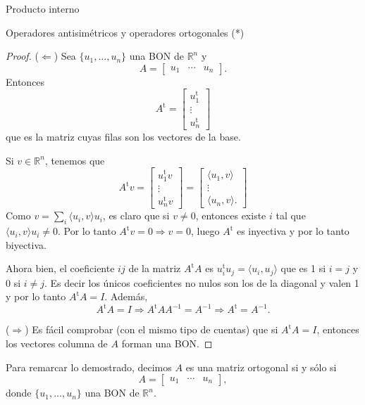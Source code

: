 \documentclass[a4paper,12pt,twoside,spanish,reqno]{amsbook}
\numberwithin{equation}{section}
\theoremstyle{definition}
\theoremstyle{remark}
\newcommand{\la}{\langle}
\newcommand{\ra}{\rangle}
\renewcommand{\t}{{\operatorname{t}}}
\newcommand{\R}{\mathbb R}
\begin{document}
\begin{chapter}{Producto interno}
\begin{section}{Operadores antisimétricos y operadores ortogonales (*)}
\begin{proof}
            ($\Leftarrow$)
            Sea $\{u_1,\ldots,u_n\}$ una BON de $\R^n$ y
            $$ A = \begin{bmatrix}
            u_1 & \cdots & u_n
            \end{bmatrix}. 
            $$
            Entonces
            $$
            A^{\t} = \begin{bmatrix}
            u_1^{\t} \\ \vdots \\ u_n^{\t}
            \end{bmatrix}
            $$
            que es la matriz cuyas filas son los vectores de la base.
            
            
            Si $v \in \R^n$, tenemos que 
            $$
            A^{\t}v = \begin{bmatrix}
            u_1^{\t}v \\ \vdots \\ u_n^{\t}v 
            \end{bmatrix} = 
            \begin{bmatrix}
            \la u_1, v \ra \\ \vdots \\ \la u_n, v \ra.
            \end{bmatrix}
            $$
            Como $v = \sum_i \la u_i, v \ra u_i$, es claro que si $v \ne 0$, entonces existe $i$ tal que $\la u_i, v \ra u_i \ne 0$. Por lo tanto $A^{\t}v=0 \Rightarrow v=0$, luego $A^{\t}$  es inyectiva y por lo tanto biyectiva.
            
        Ahora bien,  el coeficiente $ij$  de la matriz $A^{\t}A$ es $u_i^{\t}u_j = \la u_i,u_j\ra$ que es 1 si $i=j$ y 0 si $i\ne j$. Es decir los únicos coeficientes no nulos son los de la diagonal y valen 1 y por lo tanto $A^{\t}A=I$. Además, $$A^{\t}A = I \Rightarrow A^{\t}AA^{-1} = A^{-1} \Rightarrow A^{\t} = A^{-1}.$$ 
        
        ($\Rightarrow$) Es fácil comprobar (con el mismo tipo de cuentas) que si $A^{\t}A=I$, entonces los vectores columna de $A$ forman una BON.
        
        \end{proof}
        
        Para remarcar lo demostrado, decimos  $A$ es una matriz ortogonal si y sólo si
        $$ A = \begin{bmatrix}
        u_1 & \cdots & u_n
        \end{bmatrix}, 
        $$
        donde  $\{u_1,\ldots,u_n\}$ una BON de $\R^n$.
        

\end{section}
\end{chapter}
\end{document}
